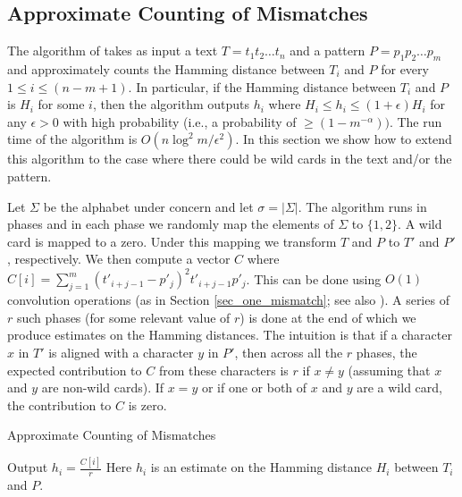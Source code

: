 \subsection{Approximate Counting of Mismatches}
\label{sec_approx_count_rand}




The algorithm of \cite{KAR93} takes as input a text $T=t_1t_2\ldots t_n$ and a
pattern $P=p_1p_2\ldots p_m$ and approximately counts the Hamming distance
between $T_i$ and $P$ for every $1\leq i\leq (n-m+1)$. In particular, if the
Hamming distance between $T_i$ and $P$ is $H_i$ for some $i$, then the
algorithm outputs $h_i$ where $H_i\leq h_i\leq (1+\epsilon)H_i$ for any
$\epsilon>0$ with high probability (i.e., a probability of
$\geq(1-m^{-\alpha}))$. The run time of the algorithm is
$O(n\log^2m/\epsilon^2)$. In this section we show how to extend this algorithm
to the case where there could be wild cards in the text and/or the pattern.

Let $\Sigma$ be the alphabet under concern and let $\sigma=|\Sigma|$. 
The algorithm runs in phases and in each phase we randomly map the elements of
$\Sigma$ to $\{1,2\}$. A wild card is mapped to a zero. Under this mapping we
transform $T$ and $P$ to $T'$ and $P'$, respectively.  We then compute a vector
$C$ where $C[i]=\sum_{j=1}^m (t'_{i+j-1}-p'_j)^2t'_{i+j-1}p'_j$. This can be
done using $O(1)$ convolution operations (as in
Section \ref{sec_one_mismatch}; see also \cite{CEP+07}). A series of $r$ such
phases (for some relevant value of $r$) is done at the end of which we produce estimates on the Hamming distances. The intuition is that if a
character $x$ in $T'$ is aligned with a character $y$ in $P'$, then across all
the $r$ phases, the expected contribution to $C$ from these characters is $r$
if $x\neq y$ (assuming that $x$ and $y$ are non-wild cards).  If $x=y$ or if
one or both of $x$ and $y$ are a wild card, the contribution to $C$ is zero.

{\LinesNumbered
\begin{algorithm}
\caption{Approximate Counting of Mismatches}\label{alg_A} 
  {
\nonl Output $h_i=\frac{C[i]}{r}$\; 
\nonl Here $h_i$ is an estimate on the Hamming distance
    $H_i$ between $T_i$ and $P$.
}\label{alg_A:out} 
\end{algorithm}
}

